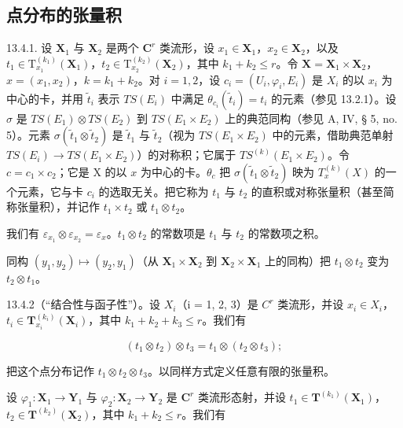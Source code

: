 \subsection{点分布的张量积}

13.4.1. 设 \(\mathbf{X}_1\) 与 \(\mathbf{X}_2\) 是两个 \(\mathbf{C}^r\) 类流形，设 \(x_1 \in \mathbf{X}_1\)，\(x_2 \in \mathbf{X}_2\)，以及 \(t_1 \in \mathrm{T}_{x_1}^{(k_1)}(\mathbf{X}_1)\)，\(t_2 \in \mathrm{T}_{x_2}^{(k_2)}(\mathbf{X}_2)\)，其中 \(k_1 + k_2 \leqslant r\)。令 \(\mathbf{X} = \mathbf{X}_1 \times \mathbf{X}_2\)，\(x = (x_1, x_2)\)，\(k = k_{1} + k_{2}\)。对 \(i = 1, 2\)，设 \(c_{i} = (U_{i}, \varphi_{i}, E_{i})\) 是 \(X_{i}\) 的以 \(x_{i}\) 为中心的卡，并用 \(\tilde{t}_{i}\) 表示 \(TS(E_{i})\) 中满足 \(\theta_{c_i}(\tilde{t}_{i}) = t_{i}\) 的元素（参见 13.2.1）。设 \(\sigma\) 是 \(TS(E_{1}) \otimes TS(E_{2})\) 到 \(TS(E_{1} \times E_{2})\) 上的典范同构（参见 A, IV, § 5, no. 5）。元素 \(\sigma(\tilde{t}_{1} \otimes \tilde{t}_{2})\) 是 \(\tilde{t}_{1}\) 与 \(\tilde{t}_{2}\)（视为 \(TS(E_{1} \times E_{2})\) 中的元素，借助典范单射 \(TS(E_{i}) \to TS(E_{1} \times E_{2})\)）的对称积；它属于 \(TS^{(k)}(E_{1} \times E_{2})\)。令 \(c = c_{1} \times c_{2}\)；它是 X 的以 \(x\) 为中心的卡。\(\theta_{c}\) 把 \(\sigma(\tilde{t}_{1} \otimes \tilde{t}_{2})\) 映为 \(T_{x}^{(k)}(X)\) 的一个元素，它与卡 \(c_{i}\) 的选取无关。把它称为 \(t_{1}\) 与 \(t_{2}\) 的直积或对称张量积（甚至简称张量积），并记作 \(t_{1} \times t_{2}\) 或 \(t_{1} \otimes t_{2}\)。

我们有 \(\varepsilon_{x_1} \otimes \varepsilon_{x_2} = \varepsilon_x\)。\(t_1 \otimes t_2\) 的常数项是 \(t_1\) 与 \(t_2\) 的常数项之积。

同构 \((y_{1}, y_{2}) \mapsto (y_{2}, y_{1})\)（从 \(\mathbf{X}_{1} \times \mathbf{X}_{2}\) 到 \(\mathbf{X}_{2} \times \mathbf{X}_{1}\) 上的同构）把 \(t_{1} \otimes t_{2}\) 变为 \(t_{2} \otimes t_{1}\)。

13.4.2（“结合性与函子性”）。设 \(X_{i}\)（i = 1, 2, 3）是 \(C^{r}\) 类流形，并设 \(x_{i} \in X_{i}\)，\(t_{i} \in \mathbf{T}_{x_{i}}^{(k_{i})}(\mathbf{X}_{i})\)，其中 \(k_{1} + k_{2} + k_{3} \leqslant r\)。我们有

\[
\left(t _ {1} \otimes t _ {2}\right) \otimes t _ {3} = t _ {1} \otimes \left(t _ {2} \otimes t _ {3}\right);
\]

把这个点分布记作 \(t_{1} \otimes t_{2} \otimes t_{3}\)。以同样方式定义任意有限的张量积。

设 \(\varphi_{1}\colon\mathbf{X}_{1}\to\mathbf{Y}_{1}\) 与 \(\varphi_{2}\colon\mathbf{X}_{2}\to\mathbf{Y}_{2}\) 是 \(\mathbf{C}^{r}\) 类流形态射，并设 \(t_{1}\in\mathbf{T}^{(k_{1})}(\mathbf{X}_{1})\)，\(t_{2}\in\mathbf{T}^{(k_{2})}(\mathbf{X}_{2})\)，其中 \(k_{1}+k_{2}\leqslant r\)。我们有

